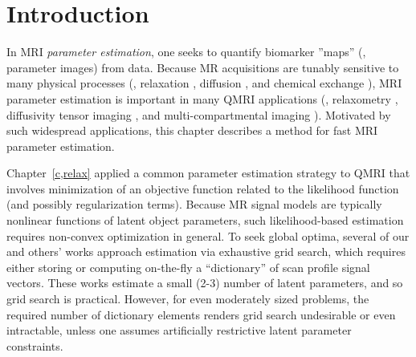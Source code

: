 
\section{Introduction}
\label{s,krr,intro}

In MRI \emph{parameter estimation},
one seeks to quantify biomarker ''maps''
(\ie, parameter images) 
from data.
Because MR acquisitions 
are tunably sensitive
to many physical processes
(\eg, relaxation \cite{bloch:1946:ni-paper}, 
diffusion \cite{torrey:56:bew}, 
and chemical exchange \cite{mcconnell:58:rrb}),
MRI parameter estimation is important
in many QMRI applications
(\eg, relaxometry \cite{bloembergen:1948:rei}, 
diffusivity tensor imaging \cite{bihan:01:dti}, 
and multi-compartmental imaging \cite{mackay:94:ivv}). 
Motivated by such widespread applications,
this chapter describes a method
for fast MRI parameter estimation.

Chapter~\ref{c,relax} applied
a common parameter estimation strategy
to QMRI
that involves minimization
of an objective function
related to the likelihood function
(and possibly regularization terms).
Because MR signal models are typically nonlinear functions
of latent object parameters,
such likelihood-based estimation
requires non-convex optimization in general.
To seek global optima,
several of our 
\cite{nataraj:14:rje,nataraj:14:mbe,nataraj::oms}
and others' 
\cite{staroswiecki:12:seo,ma:13:mrf,beneliezer:15:raa,zhao:16:mlr}
works approach estimation 
via exhaustive grid search,
which requires either storing
or computing on-the-fly a ``dictionary'' 
of scan profile signal vectors.
These works estimate a small (2-3)
number of latent parameters,
and so grid search is practical.
However, 
for even moderately sized problems,
the required number 
of dictionary elements
renders grid search undesirable or even intractable,
unless one assumes artificially restrictive latent parameter constraints.

